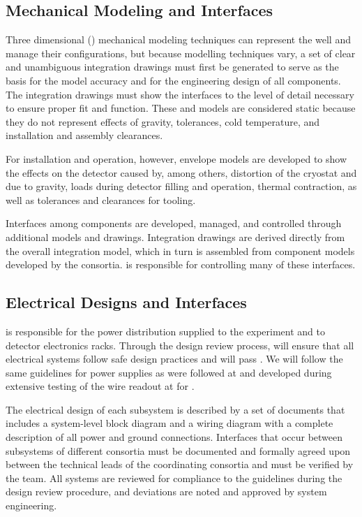 \subsection{Mechanical Modeling and Interfaces}
\label{sec:es-tc-mech}

Three dimensional (\threed) mechanical modeling techniques can represent the  well and manage their configurations, but because  \threed modelling techniques vary, a set
of clear and unambiguous \twod integration drawings must first be generated to serve as
the basis for the \threed model accuracy and for the engineering
design of all components. The \twod integration drawings must show the 
interfaces to the level of detail necessary to ensure proper fit and function.  These \threed and 
\twod models are considered static because they do not represent effects of gravity, tolerances, cold
temperature, and installation and assembly clearances.

For installation and operation, however, envelope models  are developed to 
show the effects on the detector 
caused by, among others, distortion of the cryostat and  due to gravity, loads  during 
detector filling and operation, thermal contraction,  as well as tolerances and clearances for tooling.

Interfaces among components are developed, managed, and controlled through additional models and drawings. 
Integration drawings are derived directly from the overall
integration model, which in turn is assembled from
component models developed by the consortia.
 is responsible for controlling many of these interfaces. 

\subsection{Electrical Designs and Interfaces}
\label{sec:es-tc-elec}

 is responsible for the  power
distribution supplied to the experiment and to detector electronics
racks.  Through the design review process,  will  ensure 
that all electrical systems  follow safe design practices and
will pass . We will follow the same  guidelines\cite{bib:cernedms2095958} for  power supplies as
were followed at  and developed during extensive testing of
the  wire readout at  for .  

The electrical design of each subsystem is described by a set of
documents that includes a system-level block diagram and a wiring
diagram with a complete description of all power and ground
connections. Interfaces that occur between subsystems of different consortia must be documented and formally agreed upon between the technical leads of the coordinating 
consortia and must be verified by the  team.  All systems are reviewed for compliance to the guidelines during the design review procedure, and deviations  are noted and approved by system engineering. 

